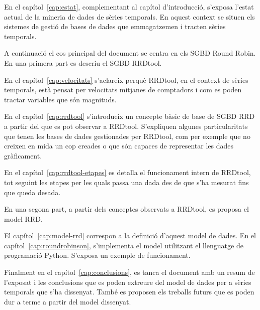 En el capítol~\ref{cap:estat}, complementant al capítol d'introducció,
s'exposa l'estat actual de la mineria de dades de sèries temporals. En
aquest context se situen els sistemes de gestió de bases de dades
que emmagatzemen i tracten sèries temporals.

A continuació el cos principal del document se centra en els SGBD
Round Robin.  En una primera part es descriu el SGBD RRDtool.

En el capítol~\ref{cap:velocitats} s'aclareix perquè RRDtool, en el
context de sèries temporals, està pensat per velocitats mitjanes de
comptadors i com es poden tractar variables que són magnituds.

En el capítol~\ref{cap:rrdtool} s'introdueix un concepte bàsic de base
de SGBD RRD a partir del que es pot observar a
RRDtool. S'expliquen algunes particularitats que tenen les
bases de dades gestionades per RRDtool, com per exemple que no creixen
en mida un cop creades o que són capaces de representar les dades
gràficament.

En el capítol~\ref{cap:rrdtool-etapes} es detalla el funcionament
intern de RRDtool, tot seguint les etapes per les quals passa una dada
des de que s'ha mesurat fins que queda desada.

En una segona part, a partir dels conceptes observats a RRDtool, es
proposa el model RRD.

El capítol~\ref{cap:model-rrd} correspon a la definició d'aquest model
de dades.  En el capítol~\ref{cap:roundrobinson}, s'implementa el
model utilitzant el llenguatge de programació Python. S'exposa un
exemple de funcionament.

Finalment en el capítol~\ref{cap:conclusions}, es tanca el document
amb un resum de l'exposat i les conclusions que es poden extreure del
model de dades per a sèries temporals que s'ha dissenyat.  També es
proposen els treballs futurs que es poden dur a terme a partir del
model dissenyat.






